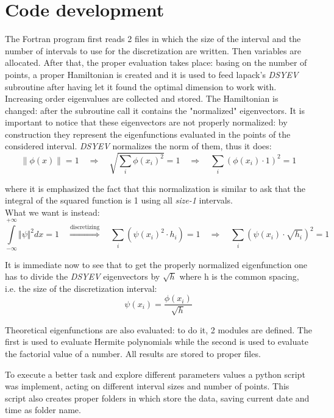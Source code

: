 \documentclass[12pt, a4paper, notitlepage]{report}
\begin{document}
\section*{Code development}
The Fortran program first reads 2 files in which the size of the interval and the number of intervals to use for the discretization are written. Then variables are allocated. After that, the proper evaluation takes place: basing on the number of points, a proper Hamiltonian is created and it is used to feed lapack's \textit{DSYEV} subroutine after having let it found the optimal dimension to work with. Increasing order eigenvalues are collected and stored. The Hamiltonian is changed: after the subroutine call it contains the "normalized" eigenvectors. It is important to notice that these eigenvectors are not properly normalized: by construction they represent the eigenfunctions evaluated in the points of the considered interval. \textit{DSYEV} normalizes the norm of them, thus it does:
$$ \lVert \phi(x) \rVert = 1 \quad \Rightarrow \quad \sqrt{\sum\limits_i \phi(x_i)^2} = 1 \quad \Rightarrow \quad \sum\limits_i  \left( \phi(x_i) \cdot 1 \right)^2 = 1 $$

where it is emphasized the fact that this normalization is similar to ask that the integral of the squared function is 1 using all \textit{size-1} intervals.\\
What we want is instead:
$$ \int\limits_{-\infty}^{+\infty} \Vert \psi \Vert^2 dx = 1 \quad \overset{\text{discretizing}}{\Rightarrow} \quad \sum\limits_i  \left( \psi(x_i)^2 \cdot h_i \right) = 1 \quad \Rightarrow \quad \sum\limits_i  \left( \psi(x_i) \cdot \sqrt{h_i} \right)^2 = 1 $$

It is immediate now to see that to get the properly normalized eigenfunction one has to divide the \textit{DSYEV} eigenvectors by $\sqrt{h}$ where h is the common spacing, i.e. the size of the discretization interval:
$$ \psi(x_i) = \frac{\phi(x_i)}{\sqrt{h}} $$

Theoretical eigenfunctions are also evaluated: to do it, 2 modules are defined. The first is used to evaluate Hermite polynomials while the second is used to evaluate the factorial value of a number.
All results are stored to proper files.

To execute a better task and explore different parameters values a python script was implement, acting on different interval sizes and number of points. This script also creates proper folders in which store the data, saving current date and time as folder name.
\end{document}
